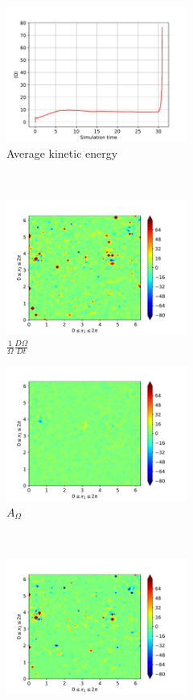 \begin{figure}[H]
    \begin{subfigure}[H]{0.45\textwidth}
        \includegraphics[height=1.75in]{media/run-cds-65/enst-average1420}
        \caption{Average kinetic energy}
    \end{subfigure}
    ~
    \begin{subfigure}[H]{0.45\textwidth}
        \includegraphics[height=1.75in]{media/run-cds-65/enst-1420}
        \caption{$\frac{1}{\Omega} \frac{D \Omega}{Dt}$}
    \end{subfigure}
    \newline
    \begin{subfigure}{0.45\textwidth}
        \includegraphics[height=1.75in]{media/run-cds-65/A-enst-1420}
        \caption{$A_{\Omega}$}
    \end{subfigure}
    ~
    \begin{subfigure}{0.45\textwidth}
        \includegraphics[height=1.75in]{media/run-cds-65/Pi-enst-1420}

\end{subfigure}
\end{figure}
